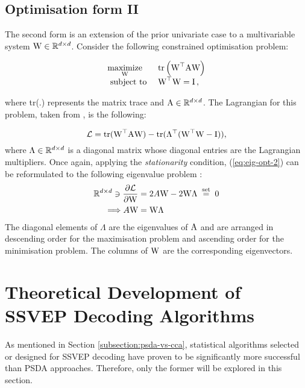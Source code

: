 \subsection{Optimisation form II}
\label{subsection:eig-opt-form-2}
The second form is an extension of the prior univariate case to a multivariable system ${\textrm{W}} \in \mathbb{R}^{d\times d}$. Consider the following constrained optimisation problem:

\begin{equation}
\begin{array}{ll}
\underset{\boldsymbol{{\textrm{W}}}}{\operatorname{maximize}} & \operatorname{tr}\left({\textrm{W}}^{\top} {\textrm{A}} \boldsymbol{{\textrm{W}}}\right) \\
\text { subject to } & \boldsymbol{{\textrm{W}}}^{\top} \boldsymbol{{\textrm{W}}}=\boldsymbol{{\textrm{I}}}\, ,
\end{array}
\label{eq:eig-opt-2}
\end{equation}

where tr(.) represents the matrix trace and ${\textrm{A}} \in \mathbb{R}^{d\times d}$. The Lagrangian for this problem, taken from
\cite{eig-tutorial}, is the following:

\begin{equation}
    \mathcal{L} = \text{tr}({\textrm{W}}^\top {\textrm{A}} {\textrm{W}}) - \text{tr}(\Lambda^\top({\textrm{W}}^\top{\textrm{W}} - {\textrm{I}})),
\end{equation}
where $\Lambda \in \mathbb{R}^{d\times d}$ is a diagonal matrix whose diagonal entries are the Lagrangian multipliers. Once again, applying the \textit{stationarity} condition, (\ref{eq:eig-opt-2}) can be reformulated to the following eigenvalue problem \cite{eig-tutorial}:
\begin{align}
\mathbb{R}^{d \times d} \ni \frac{\partial \mathcal{L}}{\partial {\textrm{W}}}&=2 A {\textrm{W}} -2 {\textrm{W}} \Lambda \stackrel{\text { set }}{=} 0 \\
\Longrightarrow A {\textrm{W}} &={\textrm{W}} \Lambda
\end{align}
The diagonal elements of $\Lambda$ are the eigenvalues of ${\textrm{A}}$ and are arranged in descending order for the maximisation problem and ascending order for the minimisation problem. The columns of ${\textrm{W}}$ are the corresponding eigenvectors.

\section{Theoretical Development of SSVEP Decoding Algorithms}
As mentioned in Section \ref{subsection:psda-vs-cca}, statistical algorithms selected or designed for SSVEP decoding have proven to be significantly more successful than PSDA approaches. Therefore, only the former will be explored in this section.

